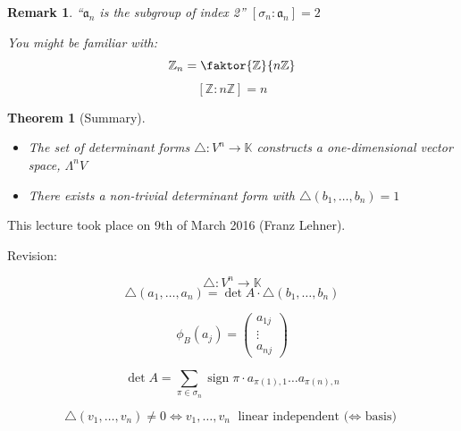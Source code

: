\documentclass[a4paper,landscape,twocolumn]{article}
\newcommand\meta[3]{This #1 took place on #2 (#3).\par}
\newtheorem{theorem}{Theorem}
\newtheorem{rem}{Remark}
\DeclareMathOperator\sign{sign}
\begin{document}
\begin{rem}
  \enquote{$\mathfrak a_n$ is the subgroup of index 2}
  $[\sigma_n: \mathfrak a_n] = 2$

  You might be familiar with:
  \[ \mathbb Z_n = \faktor{\mathbb Z}{n \mathbb Z} \]
  \[ [\mathbb Z : n \mathbb Z] = n \]
\end{rem}

\begin{theorem}[Summary]
  \label{summary-7.24}
  \begin{itemize}
    \item The set of determinant forms $\triangle: V^n \to \mathbb K$
      constructs a one-dimensional vector space, $\Lambda^n V$
    \item There exists a non-trivial determinant form with $\triangle(b_1,\ldots,b_n) = 1$
  \end{itemize}
\end{theorem}

\meta{lecture}{9th of March 2016}{Franz Lehner}

Revision:

\[ \triangle: V^n \to \mathbb K \]
\[ \triangle(a_1, \ldots, a_n) = \det{A} \cdot \triangle(b_1, \ldots, b_n) \]

\[ \phi_B(a_j) = \begin{pmatrix} a_{1j} \\ \vdots \\ a_{nj} \end{pmatrix} \]

\[ \det{A} = \sum_{\pi \in \sigma_n} \sign{\pi} \cdot a_{\pi(1),1} \ldots a_{\pi(n),n} \]

\[ \triangle(v_1, \ldots, v_n) \neq 0 \Leftrightarrow v_1, \ldots, v_n \text{ linear independent ($\Leftrightarrow$ basis)} \]
\end{document}

